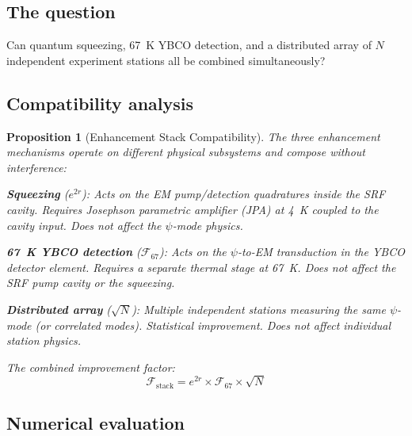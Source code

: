 \documentclass[11pt]{article}
\newtheorem{proposition}[theorem]{Proposition}
\theoremstyle{definition}
\theoremstyle{remark}
\begin{document}
\subsection{The question}

Can quantum squeezing, 67~K YBCO detection, and a distributed array
of $N$ independent experiment stations all be combined simultaneously?

\subsection{Compatibility analysis}

\begin{proposition}[Enhancement Stack Compatibility]
\label{prop:stack}
The three enhancement mechanisms operate on different physical subsystems
and compose without interference:

\textbf{Squeezing} ($e^{2r}$): Acts on the EM pump/detection quadratures
inside the SRF cavity. Requires Josephson parametric amplifier (JPA) at
4~K coupled to the cavity input. Does not affect the $\psi$-mode physics.

\textbf{67~K YBCO detection} ($\mathcal{F}_{67}$): Acts on the
$\psi$-to-EM transduction in the YBCO detector element. Requires a
separate thermal stage at 67~K. Does not affect the SRF pump cavity
or the squeezing.

\textbf{Distributed array} ($\sqrt{N}$): Multiple independent stations
measuring the same $\psi$-mode (or correlated modes). Statistical
improvement. Does not affect individual station physics.

The combined improvement factor:
\begin{equation}
\boxed{
\mathcal{F}_{\mathrm{stack}} = e^{2r}\times\mathcal{F}_{67}\times\sqrt{N}
}
\label{eq:stack}
\end{equation}
\end{proposition}

\subsection{Numerical evaluation}
\end{document}
